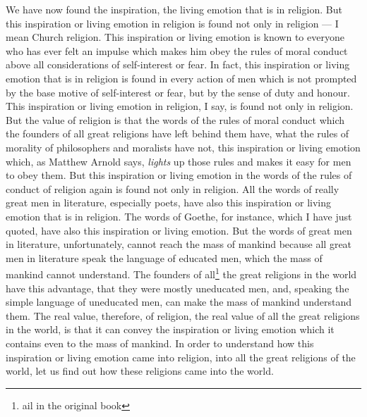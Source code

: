 We have now found the inspiration, the living emotion that is in religion.
But this inspiration or living emotion in religion is found not only in religion --- I mean Church religion.
This inspiration or living emotion is known to everyone who has ever felt an impulse which makes him obey the rules of moral conduct above all considerations of self-interest or fear.
In fact, this inspiration or living emotion that is in religion is found in every action of men which is not prompted by the base motive of self-interest or fear, but by the sense of duty and honour.
This inspiration or living emotion in religion, I say, is found not only in religion.
But the value of religion is that the words of the rules of moral conduct which the founders of all great religions have left behind them have, what the rules of morality of philosophers and moralists have not, this inspiration or living emotion which, as Matthew Arnold says, \emph{lights} up those rules and makes it easy for men to obey them.
But this inspiration or living emotion in the words of the rules of conduct of religion again is found not only in religion.
All the words of really great men in literature, especially poets, have also this inspiration or living emotion that is in religion.
The words of Goethe, for instance, which I have just quoted, have also this inspiration or living emotion.
But the words of great men in literature, unfortunately, cannot reach the mass of mankind because all great men in literature speak the language of educated men, which the mass of mankind cannot understand.
The founders of all\footnote{ail in the original book} the great religions in the world have this advantage, that they were mostly uneducated men, and, speaking the simple language of uneducated men, can make the mass of mankind understand them.
The real value, therefore, of religion, the real value of all the great religions in the world, is that it can convey the inspiration or living emotion which it contains even to the mass of mankind.
In order to understand how this inspiration or living emotion came into religion, into all the great religions of the world, let us find out how these religions came into the world.

